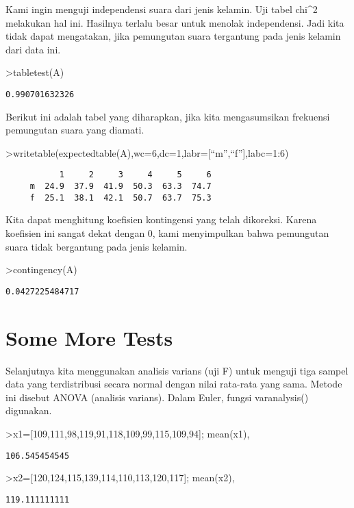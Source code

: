 \documentclass[
]{book}
\begin{document}
Kami ingin menguji independensi suara dari jenis kelamin. Uji tabel chi\^{}2 melakukan hal ini. Hasilnya terlalu besar untuk menolak independensi. Jadi kita tidak dapat mengatakan, jika pemungutan suara tergantung pada jenis kelamin dari data ini.

\textgreater tabletest(A)

\begin{verbatim}
0.990701632326
\end{verbatim}

Berikut ini adalah tabel yang diharapkan, jika kita mengasumsikan frekuensi pemungutan suara yang diamati.

\textgreater writetable(expectedtable(A),wc=6,dc=1,labr={[}``m'',``f''{]},labc=1:6)

\begin{verbatim}
           1     2     3     4     5     6
     m  24.9  37.9  41.9  50.3  63.3  74.7
     f  25.1  38.1  42.1  50.7  63.7  75.3
\end{verbatim}

Kita dapat menghitung koefisien kontingensi yang telah dikoreksi. Karena koefisien ini sangat dekat dengan 0, kami menyimpulkan bahwa pemungutan suara tidak bergantung pada jenis kelamin.

\textgreater contingency(A)

\begin{verbatim}
0.0427225484717
\end{verbatim}

\section{Some More Tests}\label{some-more-tests}

Selanjutnya kita menggunakan analisis varians (uji F) untuk menguji tiga sampel data yang terdistribusi secara normal dengan nilai rata-rata yang sama. Metode ini disebut ANOVA (analisis varians). Dalam Euler, fungsi varanalysis() digunakan.

\textgreater x1={[}109,111,98,119,91,118,109,99,115,109,94{]}; mean(x1),

\begin{verbatim}
106.545454545
\end{verbatim}

\textgreater x2={[}120,124,115,139,114,110,113,120,117{]}; mean(x2),

\begin{verbatim}
119.111111111
\end{verbatim}
\end{document}
